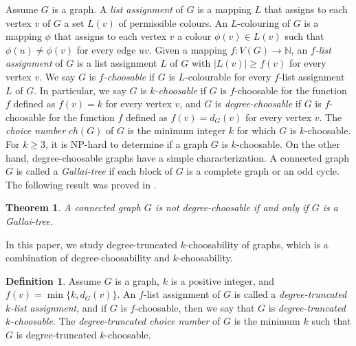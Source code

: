 \documentclass[11pt,a4paper]{article}
\newtheorem{theorem}{Theorem}
\theoremstyle{definition}
\newtheorem{definition}{Definition}
\begin{document}
Assume $G$ is a graph. A {\em list assignment} of $G$ is a mapping $L$ that assigns to each vertex $v$ of $G$ a set $L(v)$ of permissible colours. An $L$-colouring of $G$ is a mapping $\phi$ that assigns to each vertex $v$ a colour $\phi(v) \in L(v)$ such that $\phi(u) \ne \phi(v)$ for every edge $uv$. Given a mapping $f: V(G) \to \mathbb{N}$, an {\em $f$-list assignment} of $G$ is a list assignment $L$ of $G$ with $|L(v)| \ge f(v)$ for every vertex $v$. We say $G$ is {\em $f$-choosable} if 
$G$ is $L$-colourable for every $f$-list assignment $L$ of $G$. In particular, we say $G$ is {\em $k$-choosable} if 
$G$ is $f$-choosable for the function $f$ defined as $f(v)=k$ for every vertex $v$, and  $G$ is {\em degree-choosable} if $G$ is $f$-choosable for the function $f$ defined as $f(v)=d_G(v)$ for every vertex $v$.
The {\em choice number} $ch(G)$ of $G$ is the minimum integer $k$ for which $G$ is $k$-choosable.
For $k \ge 3$, it is NP-hard to determine if a graph $G$ is $k$-choosable. On the other hand, degree-choosable graphs have a simple characterization. 
A connected graph $G$ is called a {\em Gallai-tree} if each block of $G$ is a complete graph or an odd cycle. The following result was proved in \cite{ERT, Vizing}.

\begin{theorem}
    \label{thm-degree}
    A connected graph $G$ is not degree-choosable if and only if $G$ is a Gallai-tree.
\end{theorem}

In this paper, we study  degree-truncated $k$-choosability of graphs, which is a combination of degree-choosability and $k$-choosability. 

     
     \begin{definition}
         Assume $G$ is a graph, $k$ is a positive integer, and $f(v)=\min\{k, d_G(v)\}$.  An $f$-list assignment of $G$ is called a {\em degree-truncated $k$-list assignment}, and if $G$ is   $f$-choosable,  then we say that $G$ is {\em  degree-truncated $k$-choosable}. The {\em degree-truncated choice number} of $G$ is the minimum $k$ such that $G$ is degree-truncated $k$-choosable.
 \end{definition}
  
\end{document}
